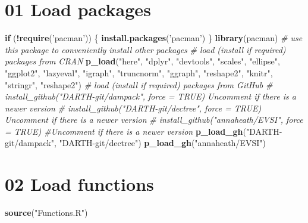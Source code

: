 \documentclass[]{article}
\newenvironment{Shaded}{\begin{snugshade}}{\end{snugshade}}
\newcommand{\KeywordTok}[1]{\textcolor[rgb]{0.13,0.29,0.53}{\textbf{#1}}}
\newcommand{\StringTok}[1]{\textcolor[rgb]{0.31,0.60,0.02}{#1}}
\newcommand{\CommentTok}[1]{\textcolor[rgb]{0.56,0.35,0.01}{\textit{#1}}}
\newcommand{\ControlFlowTok}[1]{\textcolor[rgb]{0.13,0.29,0.53}{\textbf{#1}}}
\newcommand{\OperatorTok}[1]{\textcolor[rgb]{0.81,0.36,0.00}{\textbf{#1}}}
\newcommand{\NormalTok}[1]{#1}
\begin{document}
\section{01 Load packages}\label{load-packages}

\begin{Shaded}
\begin{Highlighting}[]
\ControlFlowTok{if}\NormalTok{ (}\OperatorTok{!}\KeywordTok{require}\NormalTok{(}\StringTok{'pacman'}\NormalTok{)) \{}
  \KeywordTok{install.packages}\NormalTok{(}\StringTok{'pacman'}\NormalTok{)}
\NormalTok{\}}
\KeywordTok{library}\NormalTok{(pacman) }\CommentTok{# use this package to conveniently install other packages}
\CommentTok{# load (install if required) packages from CRAN}
\KeywordTok{p_load}\NormalTok{(}\StringTok{"here"}\NormalTok{, }\StringTok{"dplyr"}\NormalTok{, }\StringTok{"devtools"}\NormalTok{, }\StringTok{"scales"}\NormalTok{, }\StringTok{"ellipse"}\NormalTok{, }\StringTok{"ggplot2"}\NormalTok{, }\StringTok{"lazyeval"}\NormalTok{, }
       \StringTok{"igraph"}\NormalTok{, }\StringTok{"truncnorm"}\NormalTok{, }\StringTok{"ggraph"}\NormalTok{, }\StringTok{"reshape2"}\NormalTok{, }\StringTok{"knitr"}\NormalTok{, }\StringTok{"stringr"}\NormalTok{, }\StringTok{"reshape2"}\NormalTok{)                                            }
\CommentTok{# load (install if required) packages from GitHub}
\CommentTok{# install_github("DARTH-git/dampack", force = TRUE) Uncomment if there is a newer version}
\CommentTok{# install_github("DARTH-git/dectree", force = TRUE) Uncomment if there is a newer version}
\CommentTok{# install_github("annaheath/EVSI", force = TRUE) #Uncomment if there is a newer version}
\KeywordTok{p_load_gh}\NormalTok{(}\StringTok{"DARTH-git/dampack"}\NormalTok{, }\StringTok{"DARTH-git/dectree"}\NormalTok{)}
\KeywordTok{p_load_gh}\NormalTok{(}\StringTok{"annaheath/EVSI"}\NormalTok{)}
\end{Highlighting}
\end{Shaded}

\section{02 Load functions}\label{load-functions}

\begin{Shaded}
\begin{Highlighting}[]
\KeywordTok{source}\NormalTok{(}\StringTok{"Functions.R"}\NormalTok{)}
\end{Highlighting}
\end{Shaded}
\end{document}

